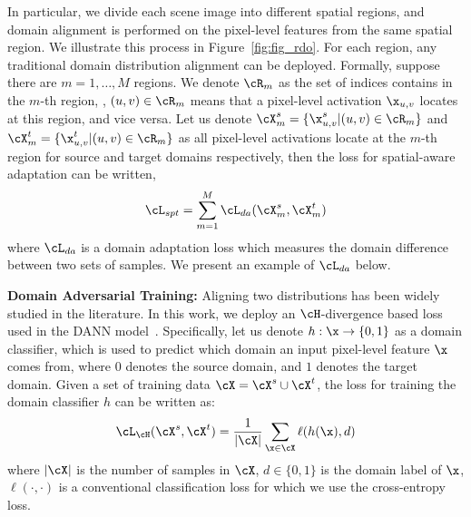 \documentclass[10pt,twocolumn,letterpaper]{article}
\begin{document}
In particular, we divide each scene image into different spatial regions, and domain alignment is performed on the pixel-level features from the same spatial region. We illustrate this process in Figure~\ref{fig:fig_rdo}. For each region, any traditional domain distribution alignment can be deployed. Formally, suppose there are $m = 1, \ldots, M$ regions. We denote $\cR_m$ as the set of indices contains in the $m$-th region, \ie, $(u,v) \in \cR_m$ means that a pixel-level activation $\x_{u,v}$ locates at this region, and vice versa. Let us denote $\cX^s_m = \{\x^s_{u,v} | (u,v) \in \cR_m\}$ and $\cX^t_m = \{\x^t_{u,v} | (u,v) \in \cR_m\}$ as all pixel-level activations locate at the $m$-th region for source and target domains respectively, then the loss for spatial-aware adaptation can be written,
\begin{eqnarray}
\label{eqn:loss_rdo}
\cL_{spt} = \sum_{m=1}^M \cL_{da}(\cX^s_m, \cX^t_m)
\end{eqnarray}
where $\cL_{da}$ is a domain adaptation loss which measures the domain difference between two sets of samples. We present an example of $\cL_{da}$ below.

\textbf{Domain Adversarial Training: } Aligning two distributions has been widely studied in the literature. In this work, we deploy an $\cH$-divergence based loss used in the DANN model~\cite{ganin2015unsupervised}. Specifically, let us denote $h : \x\rightarrow\{0,1\}$ as a domain classifier, which is used to predict which domain an input pixel-level feature $\x$ comes from, where $0$ denotes the source domain, and $1$ denotes the target domain. Given a set of training data $\cX = \cX^s \cup \cX^t$, the loss for training the domain classifier $h$ can be written as:
\begin{eqnarray}
\label{eqn:loss_dc}
\cL_{\cH}(\cX^s, \cX^t) = \frac{1}{|\cX|}\sum_{\x \in \cX}\ell(h(\x), d)
\end{eqnarray}
where $|\cX|$ is the number of samples in $\cX$, $d \in \{0, 1\}$ is the domain label of $\x$, $\ell(\cdot,\cdot)$ is a conventional classification loss for which we use the cross-entropy loss. 
\end{document}
